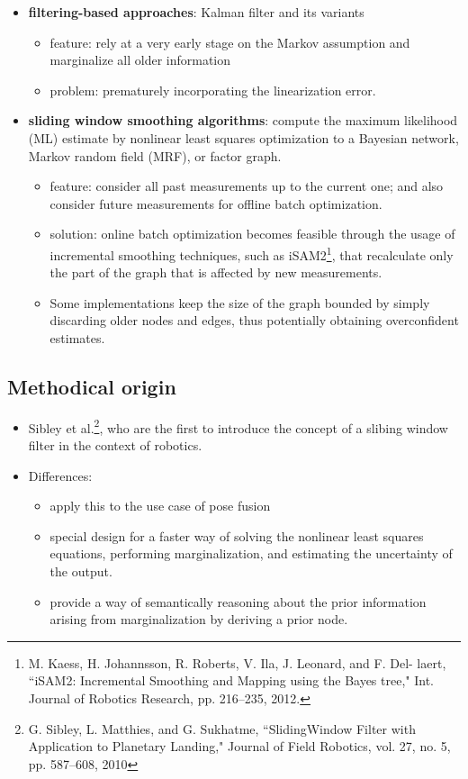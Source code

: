 \documentclass[letterpaper,10pt]{article}
\begin{document}
\begin{itemize}
	\item \textbf{filtering-based approaches}: Kalman filter and its variants
	\begin{itemize}
		\item feature: rely at a very early stage on the Markov assumption and marginalize all older information
		\item problem: prematurely incorporating the linearization error.
	\end{itemize}
	\item \textbf{sliding window smoothing algorithms}: compute the maximum likelihood (ML) estimate by nonlinear least squares optimization to a Bayesian network, Markov random field (MRF), or factor graph.
	\begin{itemize}
		\item feature: consider all past measurements up to the current one; and also consider future measurements for offline batch optimization.
		\item solution: online batch optimization becomes feasible through the usage of incremental smoothing techniques, such as iSAM2\footnote{M. Kaess, H. Johannsson, R. Roberts, V. Ila, J. Leonard, and F. Del- laert, ``iSAM2: Incremental Smoothing and Mapping using the Bayes tree," Int. Journal of Robotics Research, pp. 216–235, 2012.}, that recalculate only the part of the graph that is affected by new measurements.
		\item Some implementations keep the size of the graph bounded by simply discarding older nodes and edges, thus potentially obtaining overconfident estimates.
	\end{itemize}
\end{itemize}

\subsection{Methodical origin}

\begin{itemize}
	\item Sibley et al.\footnote{G. Sibley, L. Matthies, and G. Sukhatme, ``SlidingWindow Filter with Application to Planetary Landing," Journal of Field Robotics, vol. 27, no. 5, pp. 587–608, 2010}, who are the first to introduce the concept of a slibing window filter in the context of robotics.
	\item Differences:
	\begin{itemize}
		\item apply this to the use case of pose fusion
		\item special design for a faster way of solving the nonlinear least squares equations, performing marginalization, and estimating the uncertainty of the output.
		\item provide a way of semantically reasoning about the prior information arising from marginalization by deriving a prior node.
	\end{itemize}
\end{itemize}
\end{document}
